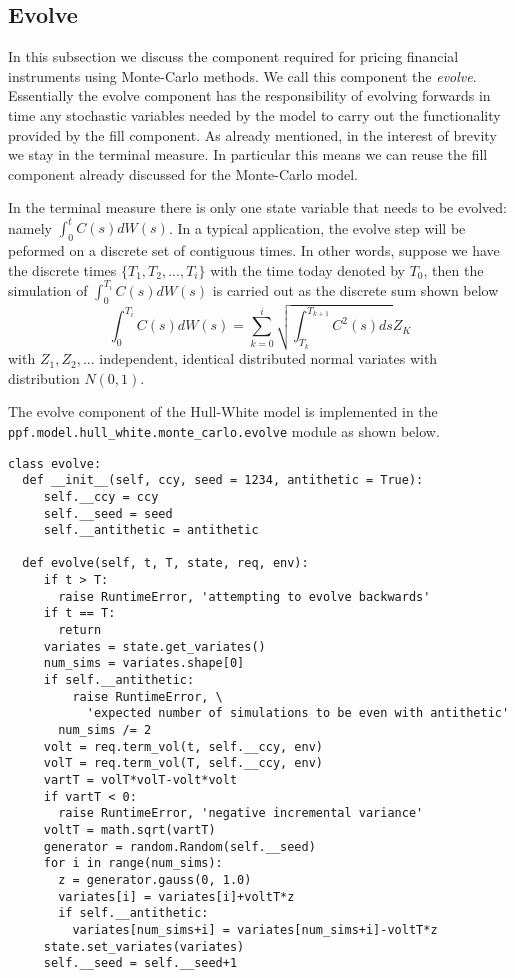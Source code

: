 \subsection{Evolve} 
In this subsection we discuss the component required for pricing
financial instruments using Monte-Carlo methods. We call this
component the \emph{evolve}.  Essentially the evolve component has the
responsibility of evolving forwards in time any stochastic variables
needed by the model to carry out the functionality provided by the
fill component. As already mentioned, in the interest of brevity we
stay in the terminal measure. In particular this means we can reuse
the fill component already discussed for the Monte-Carlo model. 

In the terminal measure there is only one state variable that
needs to be evolved: namely $\int_0^t C(s) dW(s)$.  In a typical application, 
the evolve step will be peformed on a discrete set of contiguous times. In other 
words, suppose we have the discrete times $\{T_1, T_2, ..., T_i\}$ with the time 
today denoted by $T_0$, then the simulation of $\int_0^{T_i} C(s) dW(s)$ is carried out
as the discrete sum shown below
\begin{equation}
\int_0^{T_i} C(s) dW(s) = \sum_{k=0}^{i} \sqrt{\int_{T_k}^{T_{k+1}} C^2(s) ds} Z_K
\end{equation}
with $Z_1, Z_2, ...$ independent, identical distributed normal
variates with distribution $N(0,1)$.

The evolve component of the Hull-White model is implemented in the \\
\verb|ppf.model.hull_white.monte_carlo.evolve| module as shown
below. 
\begin{verbatim}
class evolve:
  def __init__(self, ccy, seed = 1234, antithetic = True):
     self.__ccy = ccy
     self.__seed = seed
     self.__antithetic = antithetic

  def evolve(self, t, T, state, req, env):
     if t > T:
       raise RuntimeError, 'attempting to evolve backwards'
     if t == T:
       return
     variates = state.get_variates()
     num_sims = variates.shape[0]
     if self.__antithetic:
         raise RuntimeError, \
           'expected number of simulations to be even with antithetic'
       num_sims /= 2
     volt = req.term_vol(t, self.__ccy, env)
     volT = req.term_vol(T, self.__ccy, env)
     vartT = volT*volT-volt*volt
     if vartT < 0:
       raise RuntimeError, 'negative incremental variance'
     voltT = math.sqrt(vartT)
     generator = random.Random(self.__seed)
     for i in range(num_sims):
       z = generator.gauss(0, 1.0)
       variates[i] = variates[i]+voltT*z
       if self.__antithetic:
         variates[num_sims+i] = variates[num_sims+i]-voltT*z
     state.set_variates(variates)
     self.__seed = self.__seed+1
\end{verbatim}

